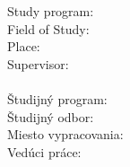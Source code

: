 \vspace*{5.5cm}
{
	Study program: \Program\\ 
	Field of Study: \Field\\
	Place: \Place\\
	Supervisor: \Supervisor \\\\
}
{
	Študijný program: \Program\\ 
	Študijný odbor: \Field\\
	Miesto vypracovania: \Place\\
	Vedúci práce: \Supervisor \\\\
}
\Month \Year